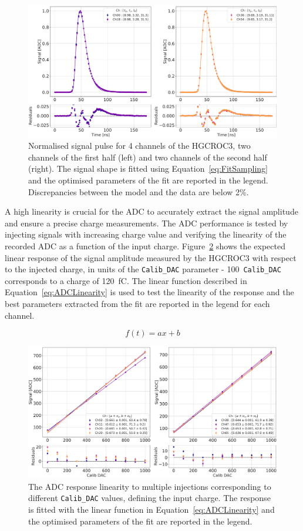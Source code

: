 \begin{figure}
    \centering
    \includegraphics[width=0.75\linewidth]{Figures/HGCAL/FitSampling.pdf}
    \caption{Normalised signal pulse for 4 channels of the HGCROC3, two channels of the first half (left) and two channels of the second half (right). The signal shape is fitted using Equation~\ref{eq:FitSampling} and the optimised parameters of the fit are reported in the legend. Discrepancies between the model and the data are below 2\%.}
    \label{fig:FitSampling}
\end{figure}

\bigbreak

A high linearity is crucial for the ADC to accurately extract the signal amplitude and ensure a precise charge measurements. The ADC performance is tested by injecting signals with increasing charge value and verifying the linearity of the recorded ADC as a function of the input charge. Figure~\ref{fig:ADC_Injection} shows the expected linear response of the signal amplitude measured by the HGCROC3 with respect to the injected charge, in units of the \texttt{Calib\_DAC} parameter - 100~\texttt{Calib\_DAC} corresponds to a charge of 120~fC. The linear function described in Equation~\ref{eq:ADCLinearity} is used to test the linearity of the response and the best parameters extracted from the fit are reported in the legend for each channel.

\begin{equation}
    f(t) = ax + b
\label{eq:ADCLinearity}
\end{equation}

\begin{figure}
    \centering
    \includegraphics[width=0.75\linewidth]{Figures/HGCAL/ADC_Injection.pdf}
    \caption{The ADC response linearity to multiple injections corresponding to different \texttt{Calib\_DAC} values, defining the input charge. The  response is fitted with the linear function in Equation~\ref{eq:ADCLinearity} and the optimised parameters of the fit are reported in the legend.}
    \label{fig:ADC_Injection}
\end{figure}

